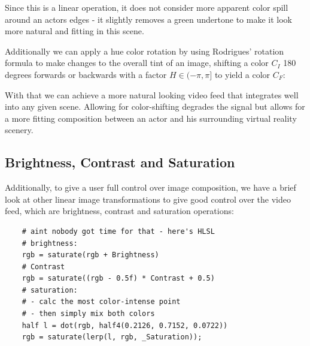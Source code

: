 

Since this is a linear operation, it does not consider more apparent color 
spill around an actors edges - it slightly removes a green undertone to make it 
look more natural and fitting in this scene.

Additionally we can apply a hue color rotation by using Rodrigues' rotation 
formula to make changes to the overall tint of an image, shifting a color $C_I$ 
180 degrees forwards or backwards with a factor $H \in (-\pi, \pi]$ to yield a 
color $C_F$:

With that we can achieve a more natural looking video feed that integrates well 
into any given scene. Allowing for color-shifting degrades the signal but 
allows for a more fitting composition between an actor and his surrounding 
virtual reality scenery.

\subsection{Brightness, Contrast and Saturation}

Additionally, to give a user full control over image composition, we have a 
brief look at other linear image transformations to give good control over the 
video feed, which are brightness, contrast and saturation operations:

\begin{lstlisting}
	# aint nobody got time for that - here's HLSL
	# brightness:
	rgb = saturate(rgb + Brightness)
	# Contrast
	rgb = saturate((rgb - 0.5f) * Contrast + 0.5)
	# saturation:
	# - calc the most color-intense point
	# - then simply mix both colors
	half l = dot(rgb, half4(0.2126, 0.7152, 0.0722))
	rgb = saturate(lerp(l, rgb, _Saturation));
\end{lstlisting}


